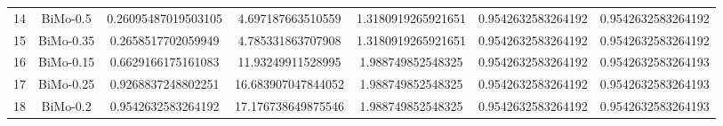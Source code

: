 \documentclass[a4paper,10pt]{article}
\begin{document}
\begin{landscape}
\begin{table}[!htp]
\begin{tabular}{ccccccc}
14&BiMo-0.5&0.26095487019503105&4.697187663510559&1.3180919265921651&0.9542632583264192&0.9542632583264192\\
15&BiMo-0.35&0.2658517702059949&4.785331863707908&1.3180919265921651&0.9542632583264192&0.9542632583264192\\
16&BiMo-0.15&0.6629166175161083&11.93249911528995&1.988749852548325&0.9542632583264192&0.9542632583264193\\
17&BiMo-0.25&0.9268837248802251&16.683907047844052&1.988749852548325&0.9542632583264192&0.9542632583264193\\
18&BiMo-0.2&0.9542632583264192&17.176738649875546&1.988749852548325&0.9542632583264192&0.9542632583264193\\
\hline
\end{tabular}
\end{table}


\end{landscape}
\end{document}
